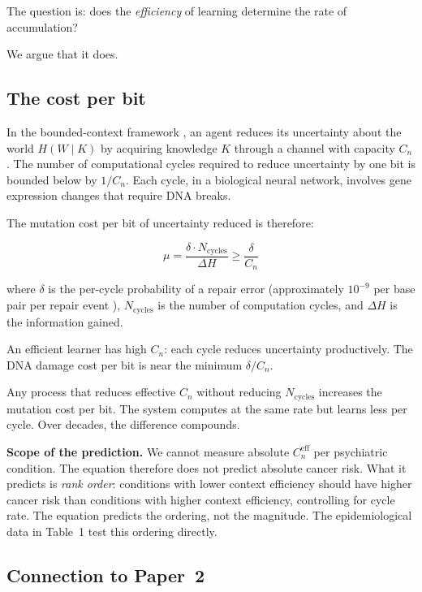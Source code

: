 \documentclass[11pt]{article}
\theoremstyle{definition}
\begin{document}
The question is: does the \emph{efficiency} of learning determine
the rate of accumulation?

We argue that it does.

\subsection{The cost per bit}

In the bounded-context framework \cite{McCarthy2026_BCA}, an agent
reduces its uncertainty about the world $H(W \mid K)$ by acquiring
knowledge $K$ through a channel with capacity $C_n$. The number
of computational cycles required to reduce uncertainty by one bit
is bounded below by $1/C_n$. Each cycle, in a biological neural
network, involves gene expression changes that require DNA breaks.

The mutation cost per bit of uncertainty reduced is therefore:

\begin{equation}
\label{eq:cost}
\mu = \frac{\delta \cdot N_{\text{cycles}}}{\Delta H}
    \geq \frac{\delta}{C_n}
\end{equation}

where $\delta$ is the per-cycle probability of a repair error
(approximately $10^{-9}$ per base pair per repair event
\cite{Lindahl1993}), $N_{\text{cycles}}$ is the number of
computation cycles, and $\Delta H$ is the information gained.

An efficient learner has high $C_n$: each cycle reduces uncertainty
productively. The DNA damage cost per bit is near the minimum
$\delta / C_n$.

Any process that reduces effective $C_n$ without reducing
$N_{\text{cycles}}$ increases the mutation cost per bit.
The system computes at the same rate but learns less per cycle.
Over decades, the difference compounds.

\textbf{Scope of the prediction.}
We cannot measure absolute $C_n^{\text{eff}}$ per psychiatric
condition. The equation therefore does not predict absolute cancer
risk. What it predicts is \emph{rank order}: conditions with lower
context efficiency should have higher cancer risk than conditions
with higher context efficiency, controlling for cycle rate.
The equation predicts the ordering, not the magnitude. The
epidemiological data in Table~1 test this ordering directly.

\subsection{Connection to Paper~2}
\end{document}
